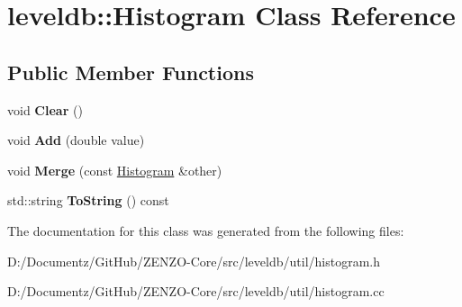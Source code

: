 \hypertarget{classleveldb_1_1_histogram}{}\section{leveldb\+::Histogram Class Reference}
\label{classleveldb_1_1_histogram}
\subsection*{Public Member Functions}
\begin{DoxyCompactItemize}
\item 
\mbox{\label{classleveldb_1_1_histogram_ab30a7e767693010656d90bfd361ecb91}} 
void {\bfseries Clear} ()
\item 
\mbox{\label{classleveldb_1_1_histogram_a7dd7147b7f6548f0bebde25ca40e4457}} 
void {\bfseries Add} (double value)
\item 
\mbox{\label{classleveldb_1_1_histogram_a22befd197208f0142b236917bcadf196}} 
void {\bfseries Merge} (const \mbox{\hyperlink{classleveldb_1_1_histogram}{Histogram}} \&other)
\item 
\mbox{\label{classleveldb_1_1_histogram_a4f261a05d287a3d9b65508502e0d646e}} 
std\+::string {\bfseries To\+String} () const
\end{DoxyCompactItemize}


The documentation for this class was generated from the following files\+:\begin{DoxyCompactItemize}
\item 
D\+:/\+Documentz/\+Git\+Hub/\+Z\+E\+N\+Z\+O-\/\+Core/src/leveldb/util/histogram.\+h\item 
D\+:/\+Documentz/\+Git\+Hub/\+Z\+E\+N\+Z\+O-\/\+Core/src/leveldb/util/histogram.\+cc\end{DoxyCompactItemize}

